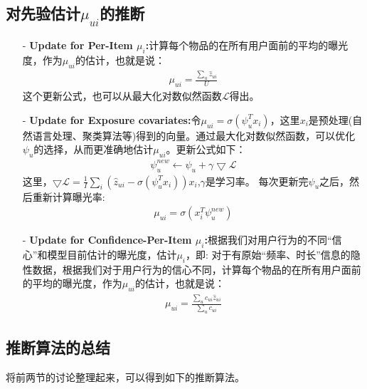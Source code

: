 \documentclass[notitlepage,cs4size,punct,oneside]{ctexrep}
\numberwithin{equation}{chapter}
\theoremstyle{mystyle}
\begin{document}
\subsection{对先验估计$\mu_{ui}$的推断}
\begin{itemize}
\item[-] \textbf{Update for Per-Item $\mu_i$:}计算每个物品的在所有用户面前的平均的曝光度，作为$\mu_{ui}$的估计，也就是说：
		\begin{eqnarray}
		\mu_{ui}=\frac{\sum_{u}\hat{z}_{ui}}{U}\label{updatePerItem}
		\end{eqnarray}
		这个更新公式，也可以从最大化对数似然函数$\mathcal{L}$得出。
\item[-] \textbf{Update for Exposure covariates:}令$\mu_{ui}=\sigma(\psi_u^Tx_i)$，这里$x_i$是预处理(自然语言处理、聚类算法等)得到的向量。通过最大化对数似然函数，可以优化$\psi_u$的选择，从而更准确地估计$\mu_{ui}$。更新公式如下：
		\begin{eqnarray}
		\psi_{u}^{new}\leftarrow\psi_{u}+\gamma \bigtriangledown \mathcal{L} \label{updatePsi}
		\end{eqnarray}
		这里，$\bigtriangledown\mathcal{L}=\frac{1}{I} \sum_i (\hat{z}_{ui}-\sigma(\psi_u^Tx_i))x_i$,$\gamma$是学习率。
		每次更新完$\psi_u$之后，然后重新计算曝光率:
		\begin{eqnarray}
		\mu_{ui}=\sigma(x_i^T\psi_{u}^{new})\label{updateMuui}
		\end{eqnarray}


		

\item[-] \textbf{Update for Confidence-Per-Item $\mu_i$:}根据我们对用户行为的不同“信心”和模型目前估计的曝光度，估计$\mu_i$，即:
对于有原始“频率、时长”信息的隐性数据，根据我们对于用户行为的信心不同，计算每个物品的在所有用户面前的平均的曝光度，作为$\mu_{ui}$的估计，也就是说：
		\begin{eqnarray}
		\mu_{ui}=\frac{\sum_{u}c_{ui}\hat{z}_{ui}}{\sum_{u}c_{ui}}\label{updateConfidencePerItem}
		\end{eqnarray}

\end{itemize}

\subsection{推断算法的总结}
将前两节的讨论整理起来，可以得到如下的推断算法。
\end{document}
